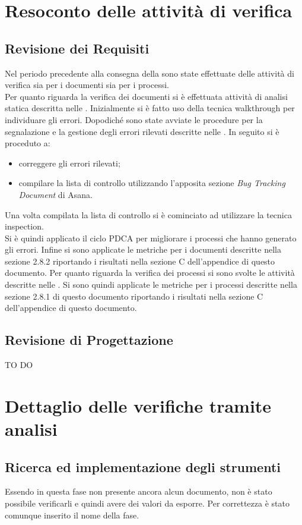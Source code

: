 \pagebreak


\section{Resoconto delle attività di verifica}
	\subsection{Revisione dei Requisiti}
	Nel periodo precedente alla consegna della \RR{} sono state effettuate delle attività di verifica sia per i documenti sia per i processi.\\
	Per quanto riguarda la verifica dei documenti si è effettuata attività di analisi statica descritta nelle \docNameVersionNdP. Inizialmente si è fatto uso della tecnica 	walkthrough per individuare gli errori. Dopodiché sono state avviate le procedure per la segnalazione e la gestione degli errori rilevati descritte nelle \docNameVersionNdP.
	In seguito si è proceduto a:
	\begin{itemize}
		\item correggere gli errori rilevati;
		\item compilare la lista di controllo utilizzando l'apposita sezione \emph{Bug Tracking Document} di Asana.
	\end{itemize}
	Una volta compilata la lista di controllo si è cominciato ad utilizzare la tecnica inspection.\\
	Si è quindi applicato il ciclo PDCA per migliorare i processi che hanno generato gli errori. Infine si sono applicate le metriche per i documenti descritte nella sezione 2.8.2 riportando i risultati nella sezione C dell'appendice di questo documento.
	Per quanto riguarda la verifica dei processi si sono svolte le attività descritte nelle \docNameVersionNdP{}. Si sono quindi applicate le metriche per i processi descritte nella sezione 2.8.1 di questo documento riportando i risultati nella sezione C dell'appendice di questo documento.
	\subsection{Revisione di Progettazione}
	TO DO
\pagebreak

\section{Dettaglio delle verifiche tramite analisi}
	\subsection{Ricerca ed implementazione degli strumenti}
	Essendo in questa fase non presente ancora alcun documento, non è stato possibile verificarli e quindi avere dei valori da esporre. Per correttezza è stato comunque inserito il nome della fase.

